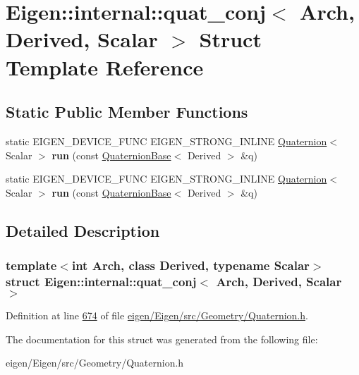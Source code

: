\hypertarget{struct_eigen_1_1internal_1_1quat__conj}{}\section{Eigen\+:\+:internal\+:\+:quat\+\_\+conj$<$ Arch, Derived, Scalar $>$ Struct Template Reference}
\label{struct_eigen_1_1internal_1_1quat__conj}
\subsection*{Static Public Member Functions}
\begin{DoxyCompactItemize}
\item 
\mbox{\label{struct_eigen_1_1internal_1_1quat__conj_aacb4c3ff28770adad256f1dea67e4d34}} 
static E\+I\+G\+E\+N\+\_\+\+D\+E\+V\+I\+C\+E\+\_\+\+F\+U\+NC E\+I\+G\+E\+N\+\_\+\+S\+T\+R\+O\+N\+G\+\_\+\+I\+N\+L\+I\+NE \hyperlink{group___geometry___module_class_eigen_1_1_quaternion}{Quaternion}$<$ Scalar $>$ {\bfseries run} (const \hyperlink{group___geometry___module_class_eigen_1_1_quaternion_base}{Quaternion\+Base}$<$ Derived $>$ \&q)
\item 
\mbox{\label{struct_eigen_1_1internal_1_1quat__conj_aacb4c3ff28770adad256f1dea67e4d34}} 
static E\+I\+G\+E\+N\+\_\+\+D\+E\+V\+I\+C\+E\+\_\+\+F\+U\+NC E\+I\+G\+E\+N\+\_\+\+S\+T\+R\+O\+N\+G\+\_\+\+I\+N\+L\+I\+NE \hyperlink{group___geometry___module_class_eigen_1_1_quaternion}{Quaternion}$<$ Scalar $>$ {\bfseries run} (const \hyperlink{group___geometry___module_class_eigen_1_1_quaternion_base}{Quaternion\+Base}$<$ Derived $>$ \&q)
\end{DoxyCompactItemize}


\subsection{Detailed Description}
\subsubsection*{template$<$int Arch, class Derived, typename Scalar$>$\newline
struct Eigen\+::internal\+::quat\+\_\+conj$<$ Arch, Derived, Scalar $>$}



Definition at line \hyperlink{eigen_2_eigen_2src_2_geometry_2_quaternion_8h_source_l00674}{674} of file \hyperlink{eigen_2_eigen_2src_2_geometry_2_quaternion_8h_source}{eigen/\+Eigen/src/\+Geometry/\+Quaternion.\+h}.



The documentation for this struct was generated from the following file\+:\begin{DoxyCompactItemize}
\item 
eigen/\+Eigen/src/\+Geometry/\+Quaternion.\+h\end{DoxyCompactItemize}
